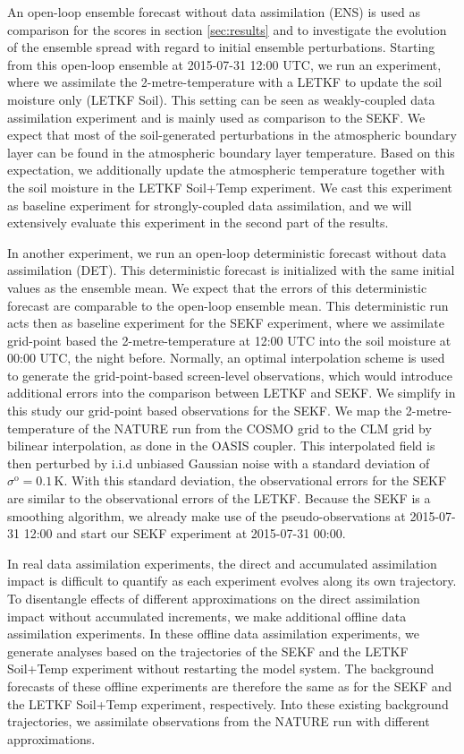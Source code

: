 \documentclass[hess, manuscript]{copernicus}
\begin{document}
An open-loop ensemble forecast without data assimilation (ENS) is used as comparison for the scores in section \ref{sec:results} and to investigate the evolution of the ensemble spread with regard to initial ensemble perturbations.
Starting from this open-loop ensemble at 2015-07-31 12:00 UTC, we run an experiment, where we assimilate the 2-metre-temperature with a LETKF to update the soil moisture only (LETKF Soil).
This setting can be seen as weakly-coupled data assimilation experiment and is mainly used as comparison to the SEKF.
We expect that most of the soil-generated perturbations in the atmospheric boundary layer can be found in the atmospheric boundary layer temperature.
Based on this expectation, we additionally update the atmospheric temperature together with the soil moisture in the LETKF Soil+Temp experiment.
We cast this experiment as baseline experiment for strongly-coupled data assimilation, and we will extensively evaluate this experiment in the second part of the results.

In another experiment, we run an open-loop deterministic forecast without data assimilation (DET).
This deterministic forecast is initialized with the same initial values as the ensemble mean.
We expect that the errors of this deterministic forecast are comparable to the open-loop ensemble mean.
This deterministic run acts then as baseline experiment for the SEKF experiment, where we assimilate grid-point based the 2-metre-temperature at 12:00 UTC into the soil moisture at 00:00 UTC, the night before.
Normally, an optimal interpolation scheme is used to generate the grid-point-based screen-level observations, which would introduce additional errors into the comparison between LETKF and SEKF.
We simplify in this study our grid-point based observations for the SEKF.
We map the 2-metre-temperature of the NATURE run from the COSMO grid to the CLM grid by bilinear interpolation, as done in the OASIS coupler.
This interpolated field is then perturbed by i.i.d unbiased Gaussian noise with a standard deviation of $\sigma^\text{o} = 0.1\,\text{K}$.
With this standard deviation, the observational errors for the SEKF are similar to the observational errors of the LETKF.
Because the SEKF is a smoothing algorithm, we already make use of the pseudo-observations at 2015-07-31 12:00 and start our SEKF experiment at 2015-07-31 00:00.

In real data assimilation experiments, the direct and accumulated assimilation impact is difficult to quantify as each experiment evolves along its own trajectory.
To disentangle effects of different approximations on the direct assimilation impact without accumulated increments, we make additional offline data assimilation experiments.
In these offline data assimilation experiments, we generate analyses based on the trajectories of the SEKF and the LETKF Soil+Temp experiment without restarting the model system.
The background forecasts of these offline experiments are therefore the same as for the SEKF and the LETKF Soil+Temp experiment, respectively.
Into these existing background trajectories, we assimilate observations from the NATURE run with different approximations.
\end{document}
